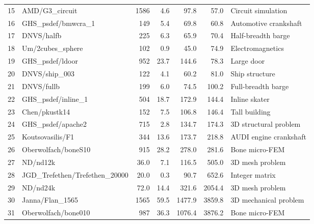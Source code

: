 \documentclass{article}
\begin{document}
\begin{table}[htbp]
\begin{center}
{\begin{tabular}{rl|rrrrl}
      15 & AMD/G3\_circuit                 & 1586     & 4.6      & 97.8     & 57.0     & Circuit simulation       \\
      16 & GHS\_psdef/bmwcra\_1            & 149      & 5.4      & 69.8     & 60.8     & Automotive crankshaft    \\
      17 & DNVS/halfb                      & 225      & 6.3      & 65.9     & 70.4     & Half-breadth barge       \\
      18 & Um/2cubes\_sphere               & 102      & 0.9      & 45.0     & 74.9     & Electromagnetics         \\
      19 & GHS\_psdef/ldoor                & 952      & 23.7     & 144.6    & 78.3     & Large door               \\
      20 & DNVS/ship\_003                  & 122      & 4.1      & 60.2     & 81.0     & Ship structure           \\
      21 & DNVS/fullb                      & 199      & 6.0      & 74.5     & 100.2    & Full-breadth barge       \\
      22 & GHS\_psdef/inline\_1            & 504      & 18.7     & 172.9    & 144.4    & Inline skater            \\
      23 & Chen/pkustk14                   & 152      & 7.5      & 106.8    & 146.4    & Tall building            \\
      24 & GHS\_psdef/apache2              & 715      & 2.8      & 134.7    & 174.3    & 3D structural problem    \\
      25 & Koutsovasilis/F1                & 344      & 13.6     & 173.7    & 218.8    & AUDI engine crankshaft   \\
      26 & Oberwolfach/boneS10             & 915      & 28.2     & 278.0    & 281.6    & Bone micro-FEM           \\
      27 & ND/nd12k                        & 36.0     & 7.1      & 116.5    & 505.0    & 3D mesh problem          \\
      28 & JGD\_Trefethen/Trefethen\_20000 & 20.0     & 0.3      & 90.7     & 652.6    & Integer matrix           \\
      29 & ND/nd24k                        & 72.0     & 14.4     & 321.6    & 2054.4   & 3D mesh problem          \\
      30 & Janna/Flan\_1565                & 1565     & 59.5     & 1477.9   & 3859.8   & 3D mechanical problem    \\
      31 & Oberwolfach/bone010             & 987      & 36.3     & 1076.4   & 3876.2   & Bone micro-FEM           \\

\end{tabular}}
\end{center}
\end{table}
\end{document}
